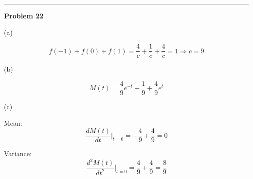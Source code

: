 \documentclass[letterpaper, 11pt]{article}
\newcommand{\1}{\mathds{1}}	%
\theoremstyle{definition}
\begin{document}
\bigskip
\hrule
\bigskip

\textbf{Problem 22}

(a)

\[
    f(-1) + f(0) + f(1) = \frac{4}{c} + \frac{1}{c} + \frac{4}{c} = 1 \Longrightarrow c = 9
\]

(b)

\[
    M(t) = \frac{4}{9} e^{-t} + \frac{1}{9} + \frac{4}{9} e^t
\]

(c)

Mean: \[
    \frac{dM(t)}{dt}\Big|_{t=0}= - \frac{4}{9} + \frac{4}{9} = 0
\]

Variance: \[
    \frac{d^2M(t)}{dt^2}\Big|_{t=0} = \frac{4}{9} + \frac{4}{9}  = \frac{8}{9}
\]

\end{document}
